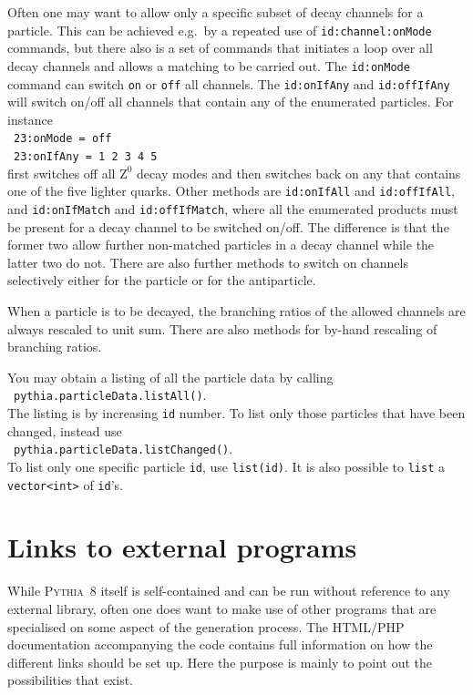 \documentclass{elsartmod}
\newcommand{\cindent}{\hspace*{10mm}~}
\begin{document}
Often one may want to allow only a specific subset of decay channels
for a particle. This can be achieved e.g.\ by a repeated use of 
\texttt{id:channel:onMode} commands, but there also is a set of commands 
that initiates a loop over all decay channels and allows a matching to be 
carried out. The \texttt{id:onMode} command can switch \texttt{on} or 
\texttt{off} all channels. The \texttt{id:onIfAny} and \texttt{id:offIfAny} 
will switch on/off all channels that contain any of the enumerated 
particles. For instance\\
\cindent \texttt{23:onMode = off}\\
\cindent \texttt{23:onIfAny = 1 2 3 4 5}\\
first switches off all $\mathrm{Z}^0$ decay modes and then switches
 back on any that contains one of the five lighter quarks. Other 
methods are \texttt{id:onIfAll} and \texttt{id:offIfAll}, and 
\texttt{id:onIfMatch} and \texttt{id:offIfMatch},
where all the enumerated products must be present for a decay channel 
to be switched on/off. The difference is that the former two allow further
non-matched particles in a decay channel while the latter two do not. 
There are also further methods to switch on channels selectively either
for the particle or for the antiparticle.

When a particle is to be decayed, the branching ratios of the allowed 
channels are always rescaled to unit sum. There are also methods for 
by-hand rescaling of branching ratios.

You may obtain a listing of all the particle data by calling\\
\cindent \texttt{pythia.particleData.listAll()}.\\ 
The listing is by increasing \texttt{id} number. To list only those 
particles that have been changed, instead use\\ 
\cindent \texttt{pythia.particleData.listChanged()}.\\ 
To list only one specific particle \texttt{id}, use \texttt{list(id)}. 
It is also possible to \texttt{list} a \texttt{vector<int>} of 
\texttt{id}'s. 

\section{Links to external programs \label{sec:external}}

While \textsc{Pythia}~8 itself is self-contained and can be
run without reference to any external library, often one does
want to make use of other programs that are specialised on some aspect
of the generation process. The HTML/PHP documentation accompanying the
code contains full information on how the different links should be set
up. Here the purpose is mainly to point out the possibilities that
exist.
\end{document}
